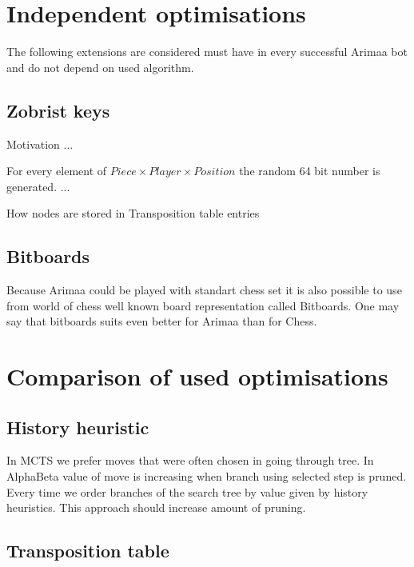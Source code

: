 \section{Independent optimisations}
The following extensions are considered must have in every successful Arimaa
bot and do not depend on used algorithm.

	\subsection{Zobrist keys}
	Motivation ...

	For every element of $Piece\times Player\times Position$ the random 64 bit
	number is generated. ...

	How nodes are stored in Transposition table entries

	\subsection{Bitboards}
	Because Arimaa could be played with standart chess set it is also possible
	to use from world of chess well known board representation called
	Bitboards. One may say that bitboards suits even better for Arimaa than for
	Chess.

\section{Comparison of used optimisations}

\subsection{History heuristic}
In MCTS we prefer moves that were often chosen in going through tree. In
AlphaBeta value of move is increasing when branch using selected step is
pruned. Every time we order branches of the search tree by value given by
history heuristics. This approach should increase amount of pruning.

\subsection{Transposition table}

